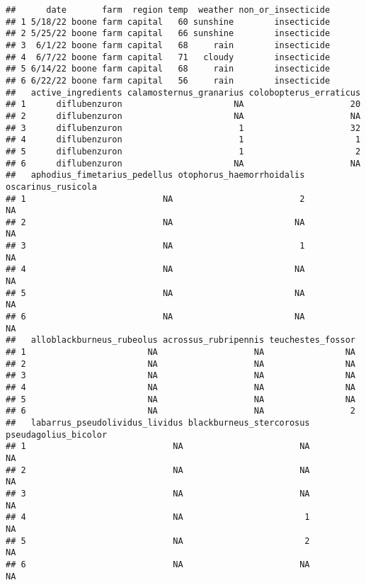 \documentclass[
]{article}
\begin{document}
\begin{verbatim}
##      date       farm  region temp  weather non_or_insecticide
## 1 5/18/22 boone farm capital   60 sunshine        insecticide
## 2 5/25/22 boone farm capital   66 sunshine        insecticide
## 3  6/1/22 boone farm capital   68     rain        insecticide
## 4  6/7/22 boone farm capital   71   cloudy        insecticide
## 5 6/14/22 boone farm capital   68     rain        insecticide
## 6 6/22/22 boone farm capital   56     rain        insecticide
##   active_ingredients calamosternus_granarius colobopterus_erraticus
## 1      diflubenzuron                      NA                     20
## 2      diflubenzuron                      NA                     NA
## 3      diflubenzuron                       1                     32
## 4      diflubenzuron                       1                      1
## 5      diflubenzuron                       1                      2
## 6      diflubenzuron                      NA                     NA
##   aphodius_fimetarius_pedellus otophorus_haemorrhoidalis oscarinus_rusicola
## 1                           NA                         2                 NA
## 2                           NA                        NA                 NA
## 3                           NA                         1                 NA
## 4                           NA                        NA                 NA
## 5                           NA                        NA                 NA
## 6                           NA                        NA                 NA
##   alloblackburneus_rubeolus acrossus_rubripennis teuchestes_fossor
## 1                        NA                   NA                NA
## 2                        NA                   NA                NA
## 3                        NA                   NA                NA
## 4                        NA                   NA                NA
## 5                        NA                   NA                NA
## 6                        NA                   NA                 2
##   labarrus_pseudolividus_lividus blackburneus_stercorosus pseudagolius_bicolor
## 1                             NA                       NA                   NA
## 2                             NA                       NA                   NA
## 3                             NA                       NA                   NA
## 4                             NA                        1                   NA
## 5                             NA                        2                   NA
## 6                             NA                       NA                   NA

\end{verbatim}
\end{document}
